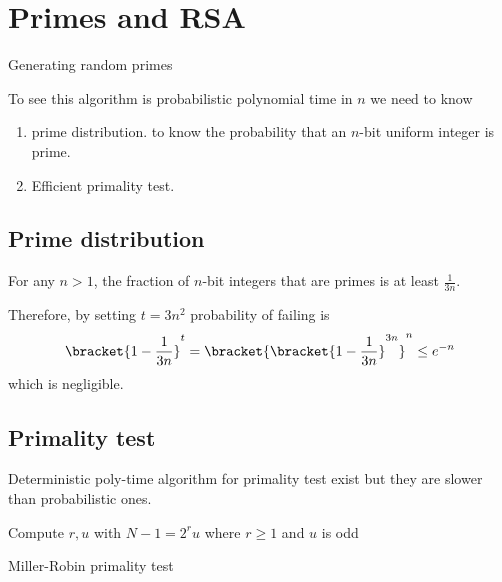 \section{Primes and RSA}
\begin{algorithm}
    \DontPrintSemicolon
    \Return{\(\perp\)}
    \caption{Generating random primes}
\end{algorithm}
To see this algorithm is probabilistic polynomial time in \(n\) we need to know 
\begin{enumerate}
    \item prime distribution. to know the probability that an \(n\)-bit uniform integer is prime. 
    \item Efficient primality test.
\end{enumerate}
\subsection{Prime distribution}
\begin{theorem} 
    For any \(n > 1\), the fraction of \(n\)-bit integers that are primes is at least \(\frac{1}{3n}\).
\end{theorem}
Therefore, by setting \(t = 3n^2\) probability of failing is 
\begin{equation*}
    \bracket{1 - \dfrac{1}{3n}}^t = \bracket{\bracket{1 - \dfrac{1}{3n}}^{3n}}^n \leq e^{-n}
\end{equation*}
which is negligible. 
\subsection{Primality test}
Deterministic poly-time algorithm for primality test exist but they are slower than probabilistic ones. 
\begin{algorithm}
    \DontPrintSemicolon
    Compute \(r,u\) with \(N - 1 = 2^r u\) where \(r \geq 1\) and \(u\) is odd\;
    \caption{Miller-Robin primality test}
\end{algorithm}

